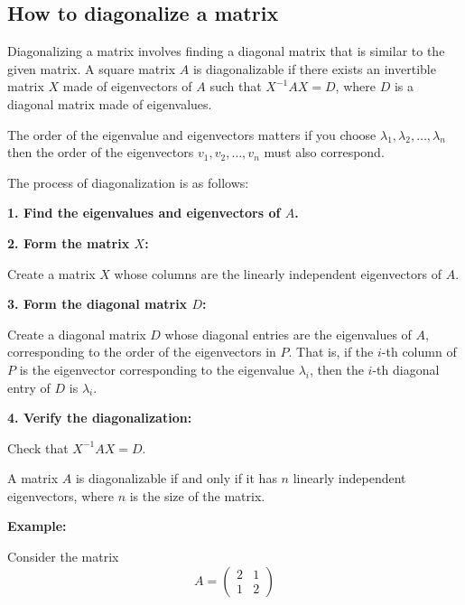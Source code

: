 \subsection{How to diagonalize a matrix}

Diagonalizing a matrix involves finding a diagonal matrix that is similar to the given matrix. 
A square matrix \(A\) is diagonalizable if there exists an invertible matrix \(X\) made of eigenvectors of 
\(A\) such that \(X^{-1}AX = D\), where \(D\) is a diagonal matrix made of eigenvalues.

The order of the eigenvalue and eigenvectors matters if you choose \(\lambda_1, \lambda_2, \dots, \lambda_n\) then the 
order of the eigenvectors \(v_1, v_2, \dots, v_n\) must also correspond.
\vspace{\baselineskip}

The process of diagonalization is as follows:
\vspace{\baselineskip}

\textbf{1. Find the eigenvalues and eigenvectors of \(A\).}
\vspace{\baselineskip}

\textbf{2. Form the matrix \(X\):}

Create a matrix \(X\) whose columns are the linearly independent eigenvectors of \(A\).
    
\textbf{3. Form the diagonal matrix \(D\):} 

Create a diagonal matrix \(D\) whose diagonal entries are the eigenvalues of \(A\), corresponding to the order of the eigenvectors in \(P\). That is, if the \(i\)-th column of \(P\) is the eigenvector corresponding to the eigenvalue \(\lambda_i\), then the \(i\)-th diagonal entry of \(D\) is \(\lambda_i\).
    
\textbf{4. Verify the diagonalization:}
    
Check that \(X^{-1}AX = D\).
\vspace{\baselineskip}

A matrix \(A\) is diagonalizable if and only if it has \(n\) linearly independent eigenvectors, where \(n\) is the size of the matrix.
\vspace{\baselineskip}

\textbf{Example: }
\vspace{\baselineskip}

Consider the matrix
\[
A = \begin{pmatrix}
2 & 1 \\
1 & 2
\end{pmatrix}
\]

